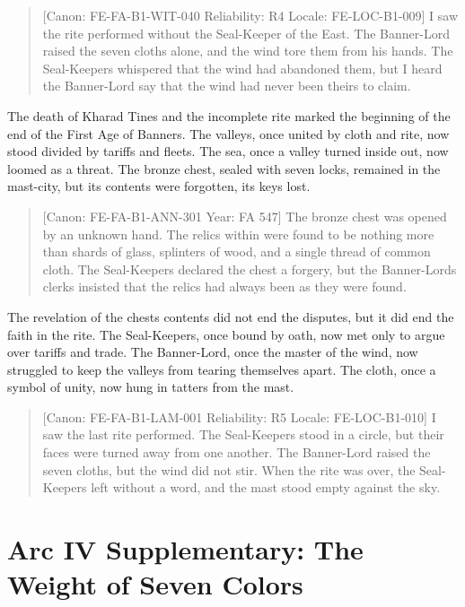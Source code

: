 \begin{quote}
{[}Canon: FE-FA-B1-WIT-040 \textbar{} Reliability: R4 \textbar{} Locale:
FE-LOC-B1-009{]} I saw the rite performed without the Seal-Keeper of the
East. The Banner-Lord raised the seven cloths alone, and the wind tore
them from his hands. The Seal-Keepers whispered that the wind had
abandoned them, but I heard the Banner-Lord say that the wind had never
been theirs to claim.
\end{quote}

The death of Kharad Tines and the incomplete rite marked the beginning
of the end of the First Age of Banners. The valleys, once united by
cloth and rite, now stood divided by tariffs and fleets. The sea, once a
valley turned inside out, now loomed as a threat. The bronze chest,
sealed with seven locks, remained in the mast-city, but its contents
were forgotten, its keys lost.

\begin{quote}
{[}Canon: FE-FA-B1-ANN-301 \textbar{} Year: FA 547{]} The bronze chest
was opened by an unknown hand. The relics within were found to be
nothing more than shards of glass, splinters of wood, and a single
thread of common cloth. The Seal-Keepers declared the chest a forgery,
but the Banner-Lord\textquotesingle s clerks insisted that the relics
had always been as they were found.
\end{quote}

The revelation of the chest\textquotesingle s contents did not end the
disputes, but it did end the faith in the rite. The Seal-Keepers, once
bound by oath, now met only to argue over tariffs and trade. The
Banner-Lord, once the master of the wind, now struggled to keep the
valleys from tearing themselves apart. The cloth, once a symbol of
unity, now hung in tatters from the mast.

\begin{quote}
{[}Canon: FE-FA-B1-LAM-001 \textbar{} Reliability: R5 \textbar{} Locale:
FE-LOC-B1-010{]} I saw the last rite performed. The Seal-Keepers stood
in a circle, but their faces were turned away from one another. The
Banner-Lord raised the seven cloths, but the wind did not stir. When the
rite was over, the Seal-Keepers left without a word, and the mast stood
empty against the sky.
\end{quote}

\section{Arc IV Supplementary: The Weight of Seven
Colors}\label{arc-iv-supplementary-the-weight-of-seven-colors}

